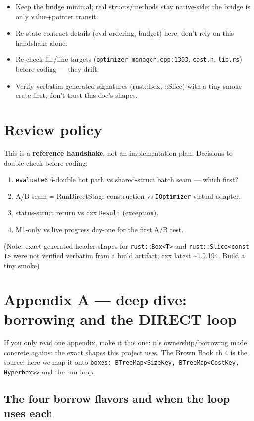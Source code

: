 \documentclass[11pt]{article}
\begin{document}
\begin{itemize}
\item Keep the bridge minimal; real structs/methods stay native-side; the bridge is
only value+pointer transit.
\item Re-state contract details (eval ordering, budget) here; don't rely on this
handshake alone.
\item Re-check file/line targets (\texttt{optimizer\_manager.cpp:1303}, \texttt{cost.h}, \texttt{lib.rs})
before coding — they drift.
\item Verify verbatim generated signatures (rust::Box, ::Slice) with a tiny smoke
crate first; don't trust this doc's shapes.
\end{itemize}
\section{Review policy}
\label{sec:org2e0540b}

This is a \textbf{reference handshake}, not an implementation plan. Decisions to
double-check before coding:

\begin{enumerate}
\item \texttt{evaluate6} 6-double hot path vs shared-struct batch seam — which first?
\item A/B seam = RunDirectStage construction vs \texttt{IOptimizer} virtual adapter.
\item status-struct return vs cxx \texttt{Result} (exception).
\item M1-only vs live progress day-one for the first A/B test.
\end{enumerate}

(Note: exact generated-header shapes for \texttt{rust::Box<T>} and \texttt{rust::Slice<const T>} were
not verified verbatim from a build artifact; cxx latest \textasciitilde{}1.0.194. Build a tiny smoke)
\section{Appendix A — deep dive: borrowing and the DIRECT loop}
\label{sec:org3a7c0b6}

If you only read one appendix, make it this one: it's ownership/borrowing made
concrete against the exact shapes this project uses. The Brown Book ch 4 is the
source; here we map it onto \texttt{boxes: BTreeMap<SizeKey, BTreeMap<CostKey,
Hyperbox>{}>{}} and the run loop.
\subsection{The four borrow flavors and when the loop uses each}
\label{sec:orgd12017e}
\end{document}
